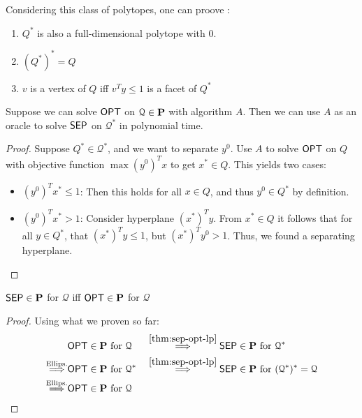 \begin{theorem}
    Considering this class of polytopes, one can proove \cite[Ch.~4,~Thm.~4.22]{comb-optimization-korte}:
    \begin{enumerate}
        \item $Q^*$ is also a full-dimensional polytope with $0$.
        \item $(Q^*)^* = Q$
        \item $v$ is a vertex of $Q$ iff $v^Ty \leq 1$ is a facet of $Q^*$
    \end{enumerate}
\end{theorem}
\begin{theorem}
    Suppose we can solve $\mathsf{OPT}$ on $\mathcal{Q} \in \pP$ with algorithm $A$.
    Then we can use $A$ as an oracle to solve $\mathsf{SEP}$ on $\mathcal{Q}^*$ in polynomial time.
    \label{thm:sep-opt-lp}
\end{theorem}
\begin{proof}
    Suppose $Q^* \in \mathcal{Q}^*$, and we want to separate $y^0$.
    Use $A$ to solve $\mathsf{OPT}$ on $Q$ with objective function $\max (y^0)^Tx$ to get $x^* \in Q$.
    This yields two cases:
    \begin{itemize}
        \item $(y^0)^Tx^* \leq 1$: Then this holds for all $x \in Q$, and thus $y^0 \in Q^*$ by definition.
        \item $(y^0)^Tx^* > 1$: Consider hyperplane $(x^*)^Ty$. From $x^* \in Q$ it follows that
              for all $y \in Q^*$, that $(x^*)^Ty \leq 1$, but $(x^*)^Ty^0 > 1$. Thus, we found a separating hyperplane.
    \end{itemize}
\end{proof}
\begin{theorem}
    $\mathsf{SEP} \in \mathbf{P}$ for $\mathcal{Q}$ iff $\mathsf{OPT} \in \mathbf{P}$ for $\mathcal{Q}$
\end{theorem}
\begin{proof} Using what we proven so far:
    \begin{alignat*}{2}
                                       & \OPT \in \pP \text{ for } \mathcal{Q}   &  & \overset{\ref{thm:sep-opt-lp}}{\IMP}  \SEP \in \pP \text{ for } \mathcal{Q}^*                 \\
        \overset{\text{Ellips.}}{\IMP} & \OPT \in \pP \text{ for } \mathcal{Q}^* &  & \overset{\ref{thm:sep-opt-lp}}{\IMP}  \SEP \in \pP \text{ for } (\mathcal{Q}^*)^*=\mathcal{Q} \\
        \overset{\text{Ellips.}}{\IMP} & \OPT \in \pP \text{ for } \mathcal{Q}
    \end{alignat*}
\end{proof}